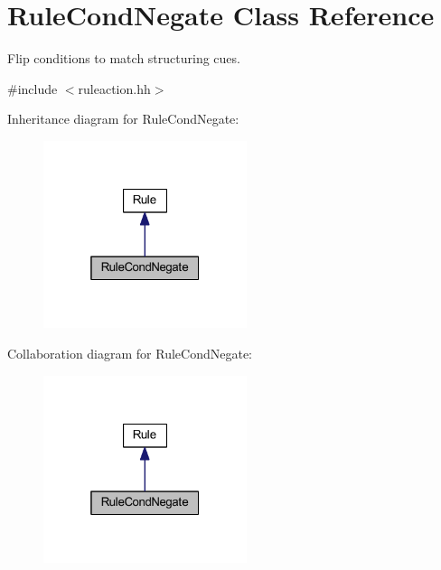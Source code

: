 \hypertarget{class_rule_cond_negate}{}\section{Rule\+Cond\+Negate Class Reference}
\label{class_rule_cond_negate}


Flip conditions to match structuring cues.  




{\ttfamily \#include $<$ruleaction.\+hh$>$}



Inheritance diagram for Rule\+Cond\+Negate\+:
\nopagebreak
\begin{figure}[H]
\begin{center}
\leavevmode
\includegraphics[width=169pt]{class_rule_cond_negate__inherit__graph}
\end{center}
\end{figure}


Collaboration diagram for Rule\+Cond\+Negate\+:
\nopagebreak
\begin{figure}[H]
\begin{center}
\leavevmode
\includegraphics[width=169pt]{class_rule_cond_negate__coll__graph}
\end{center}
\end{figure}
